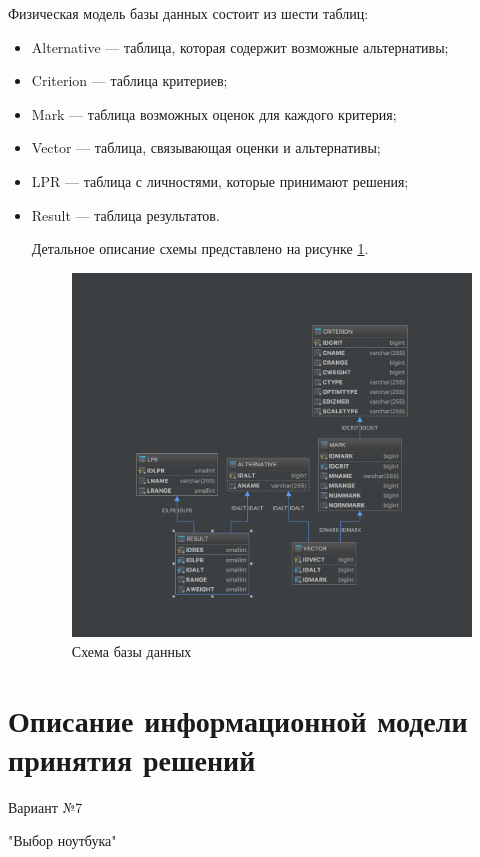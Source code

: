 \documentclass[titlepage]{article}
\begin{document}
Физическая модель базы данных состоит из шести таблиц:
\begin{itemize}
\item Alternative --- таблица, которая содержит возможные альтернативы;
\item Criterion --- таблица критериев;
\item Mark --- таблица возможных оценок для каждого критерия;
\item Vector --- таблица, связывающая оценки и альтернативы;
\item LPR --- таблица с личностями, которые принимают решения;
\item Result --- таблица результатов.

Детальное описание схемы представлено на рисунке \ref{fig:schema}.

\begin{figure}[h]
\centering
\includegraphics[scale=0.4]{schema}
\caption{Схема базы данных}
\label{fig:schema}
\end{figure}
\end{itemize}

\section*{Описание информационной модели принятия решений}

\begin{center}
Вариант №7

"Выбор ноутбука"
\end{center}
\end{document}
